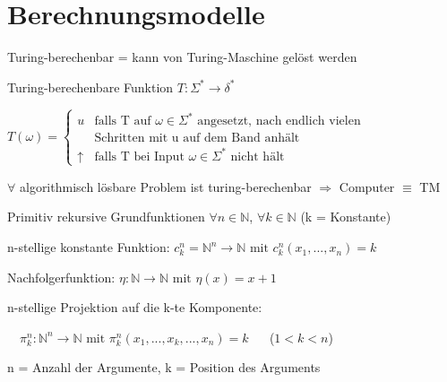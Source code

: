 \graphicspath{{images/}}

\section*{Berechnungsmodelle}

\begin{definition}{Turing-berechenbar} = kann von Turing-Maschine gelöst werden
    
    Turing-berechenbare Funktion $T: \Sigma^* \rightarrow \delta^*$

    $T(\omega) = \begin{cases}
        u & \text{falls T auf } \omega \in \Sigma^* \text{ angesetzt, nach endlich vielen}\\ 
        &\text{Schritten mit u auf dem Band anhält}\\
        \uparrow & \text{falls T bei Input } \omega \in \Sigma^* \text{ nicht hält}
    \end{cases}$
\end{definition}

\begin{remark}
    {\footnotesize
    $\forall$ algorithmisch lösbare Problem ist turing-berechenbar $\Rightarrow$ Computer $\equiv$ TM
    }
\end{remark}

\begin{theorem}{Primitiv rekursive Grundfunktionen} $\forall n \in \mathbb{N}$, $\forall k \in \mathbb{N}$ {\footnotesize (k = Konstante)}
    
    \vspace{1mm}

    n-stellige konstante Funktion: $c_k^n = \mathbb{N}^n \rightarrow \mathbb{N} \text{ mit } c_k^n (x_1, ... , x_n) = k$

    \vspace{1mm}

    Nachfolgerfunktion: $\eta : \mathbb{N} \rightarrow \mathbb{N} \text{ mit } \eta (x) = x + 1$

    \vspace{1mm}
    
    n-stellige Projektion auf die k-te Komponente: 

    \vspace{1mm}

    $\quad \pi_k^n : \mathbb{N}^n \rightarrow \mathbb{N} \text{ mit } \pi_k^n (x_1, ... ,x_k,..., x_n) = k$ {\footnotesize $\quad$ ($1 < k < n$)}
    
    {\small n = Anzahl der Argumente, k = Position des Arguments}
\end{theorem}

